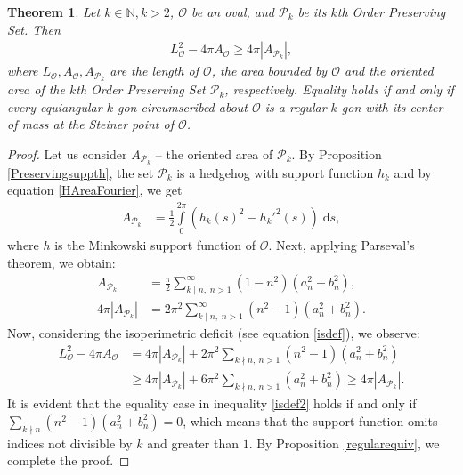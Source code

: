 \documentclass{amsart}
\newtheorem{thm}{Theorem}[section]
\theoremstyle{definition}
\numberwithin{equation}{section}
\renewcommand{\d}{\mathrm{d}}
\begin{document}
\begin{thm}\label{ThmIsoEq1}
Let $k\in \mathbb{N}, k>2$, $\mathcal{O}$ be an oval, and $\mathcal{P}_k$ be its $k$th Order Preserving Set. Then
\begin{align}\label{IsoEq}
L_{\mathcal{O}}^2 - 4\pi A_{\mathcal{O}} \geqslant 4\pi |A_{\mathcal{P}_k}| ,
\end{align}
where $L_{\mathcal{O}}, A_{\mathcal{O}}, A_{\mathcal{P}_k}$ are the length of $\mathcal{O}$, the area bounded by $\mathcal{O}$ and the oriented area of the $k$th Order Preserving Set $\mathcal{P}_k$, respectively. Equality holds if and only if every equiangular $k$-gon circumscribed about $\mathcal{O}$ is a regular $k$-gon with its center of mass at the Steiner point of $\mathcal{O}$.
\end{thm}
\begin{proof}
Let us consider $A_{\mathcal{P}_k}$ -- the oriented area of $\mathcal{P}_k$. By Proposition \ref{Preservingsuppth}, the set $\mathcal{P}_k$ is a hedgehog with support function $h_k$ and by equation \eqref{HAreaFourier}, we get
 \begin{align}\label{eq1}
 A_{\mathcal{P}_k} &= \frac{1}{2}\int \limits_{0}^{2\pi} \left(h_k(s)^2 - h_k'^2(s)\right)\; \d s,
 \end{align}
 where $h$ is the Minkowski support function of $\mathcal{O}$. Next, applying Parseval's theorem, we obtain:
 \begin{align*}
 A_{\mathcal{P}_k} &= \frac{\pi}{2}\sum_{k \mid n, \; n >1}^{\infty} (1-n^2)(a_{n}^2 + b_{n}^2),\\
 4\pi |A_{\mathcal{P}_k}| &= 2\pi^2\sum_{k \mid n, \; n >1}^{\infty} (n^2-1)(a_{n}^2 + b_{n}^2).
 \end{align*}
Now, considering the isoperimetric deficit (see equation \eqref{isdef}), we observe:
{\begin{align}\label{isdef2}
    L_{\mathcal{O}}^2 - 4\pi A_{\mathcal{O}} &= 4\pi |A_{\mathcal{P}_k}| + 2\pi^2\sum_{k \nmid n,\ n>1} (n^2-1)(a_{n}^2 + b_{n}^2) \\ \nonumber &\geqslant 4\pi |A_{\mathcal{P}_k}| + 6\pi^2\sum_{k \nmid n,\ n>1}(a_{n}^2 + b_{n}^2)\geqslant 4\pi |A_{\mathcal{P}_k}|.
\end{align}}
It is evident that the equality case in inequality \eqref{isdef2} holds if and only if \linebreak $\sum_{k \nmid n} (n^2-1)(a_{n}^2 + b_{n}^2) = 0$, which means that the support function omits indices not divisible by $k$ and greater than $1$. By Proposition \ref{regularequiv}, we complete the proof.
\end{proof}
\end{document}
